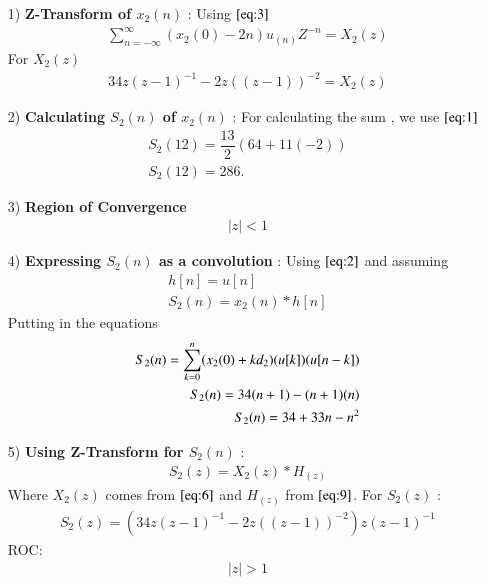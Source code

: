 \documentclass[journal,12pt,twocolumn]{IEEEtran}
\theoremstyle{remark}
\begin{document}
\begin{enumerate}
\vspace{0.05cm}
\item[1)] 
\textbf{Z-Transform of $x_2(n)$} :
Using $\eqref{eq:3}$
\vspace{0.05cm}
\begin{align}
\sum_{n=-\infty}^{\infty}(x_2(0) -2n)u_{(n)}Z^{-n} =X_2(z)
\end{align}
For $X_2(z)$ 
\begin{align}
  34z(z-1)^{-1}-
       2z((z-1))^{-2}=X_2(z) \label{eq:6}
\end{align}

\item[2)] 
\textbf{Calculating $S_2(n)$ of $x_2(n)$} :
For calculating the sum , we use $\eqref{eq:1}$
\begin{align}
 S_2{(12)} = \dfrac{13}{2}(64+11(-2))\\
 S_2{(12)}= 286.
 \end{align}
 \item[3)]
 \textbf{Region of Convergence}
\vspace{0.05cm}
\begin{align}
    \lvert z\rvert  <  1 
    \end{align}

    \vspace{0.7cm}
\item[4)]
\textbf{Expressing $S_2(n)$ as a convolution} :
Using $\eqref{eq:2}$ and assuming 
\begin{align}
         h[n]=u[n] \\
    S_2(n) = x_2(n) * h[n] 
\end{align}
Putting in the equations
\begin{align}
     S_2(n) = \sum_{k=0}^{n}(x_2(0) + kd_2)
 \notag    (u[k])(u[n-k])   \\
 S_2(n) = 34(n+1) - (n+1)(n)  \\
  S_2(n) = 34 + 33n - n^2
\end{align}
\item[5)]
\textbf{Using Z-Transform for $S_2(n)$} :
\begin{align}
    S_2(z) = X_2(z) * H_(z)
    \end{align}
    Where $X_2(z)$ comes from $\eqref{eq:6}$ and $H_(z)$ from $\eqref{eq:9}$.
    \vspace{0.05cm}
    For $S_2(z)$ :
    \begin{align}
            S_2(z) = (34z(z-1)^{-1}-
       2z((z-1))^{-2})z(z-1)^{-1}
    \end{align}
    ROC:
    \begin{align} 
    \lvert z \rvert > 1
    \end{align}
    

\end{enumerate}
\end{document}
